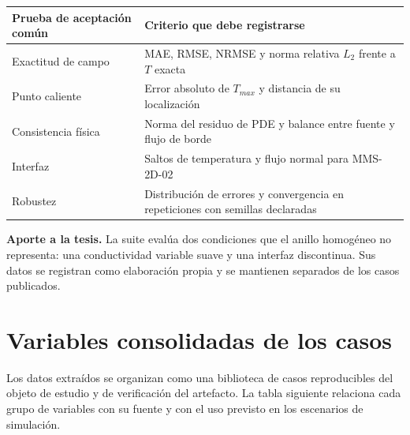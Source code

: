 \documentclass[11pt,a4paper,oneside]{report}
\newcounter{none}
\begin{document}
{\def\LTcaptype{none} %
\begin{longtable}[]{@{}
  >{\raggedright\arraybackslash}p{}
  >{\raggedright\arraybackslash}p{}@{}}
\toprule\noalign{}
\begin{minipage}[b]{\linewidth}\raggedright
Prueba de aceptación común
\end{minipage} & \begin{minipage}[b]{\linewidth}\raggedright
Criterio que debe registrarse
\end{minipage} \\
\midrule\noalign{}
\endhead
\bottomrule\noalign{}
\endlastfoot
Exactitud de campo & MAE, RMSE, NRMSE y norma relativa \(L_2\) frente a
\(T\) exacta \\
Punto caliente & Error absoluto de \(T_{max}\) y distancia de su
localización \\
Consistencia física & Norma del residuo de PDE y balance entre fuente y
flujo de borde \\
Interfaz & Saltos de temperatura y flujo normal para MMS-2D-02 \\
Robustez & Distribución de errores y convergencia en repeticiones con
semillas declaradas \\
\end{longtable}
}

\textbf{Aporte a la tesis.} La suite evalúa dos condiciones que el
anillo homogéneo no representa: una conductividad variable suave y una
interfaz discontinua. Sus datos se registran como elaboración propia y
se mantienen separados de los casos publicados.

\section{Variables consolidadas de los
casos}\label{variables-consolidadas-de-los-casos}

Los datos extraídos se organizan como una biblioteca de casos
reproducibles del objeto de estudio y de verificación del artefacto. La
tabla siguiente relaciona cada grupo de variables con su fuente y con el
uso previsto en los escenarios de simulación.
\end{document}
